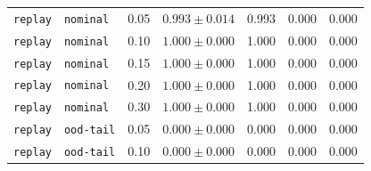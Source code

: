 \documentclass{article}
\begin{document}
\begin{center}
\begin{tabular}{lllcccc}
\texttt{replay} & \texttt{nominal} & 0.05 & $0.993 \pm 0.014$ & 0.993 & 0.000 & 0.000 \\
\texttt{replay} & \texttt{nominal} & 0.10 & $1.000 \pm 0.000$ & 1.000 & 0.000 & 0.000 \\
\texttt{replay} & \texttt{nominal} & 0.15 & $1.000 \pm 0.000$ & 1.000 & 0.000 & 0.000 \\
\texttt{replay} & \texttt{nominal} & 0.20 & $1.000 \pm 0.000$ & 1.000 & 0.000 & 0.000 \\
\texttt{replay} & \texttt{nominal} & 0.30 & $1.000 \pm 0.000$ & 1.000 & 0.000 & 0.000 \\
\texttt{replay} & \texttt{ood-tail} & 0.05 & $0.000 \pm 0.000$ & 0.000 & 0.000 & 0.000 \\
\texttt{replay} & \texttt{ood-tail} & 0.10 & $0.000 \pm 0.000$ & 0.000 & 0.000 & 0.000 \\
\bottomrule
\end{tabular}
\end{center}
\end{document}
